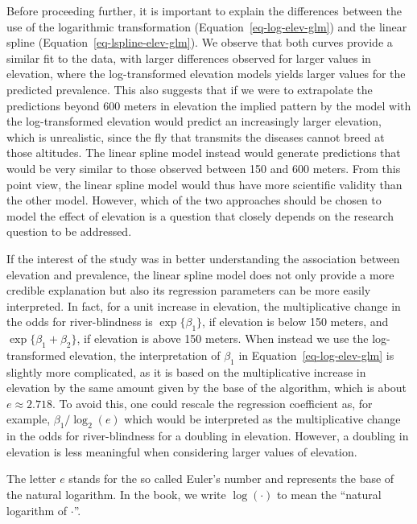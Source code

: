 \documentclass[
  letterpaper,
]{krantz}
\begin{document}
Before proceeding further, it is important to explain the differences
between the use of the logarithmic transformation
(Equation~\ref{eq-log-elev-glm}) and the linear spline
(Equation~\ref{eq-lspline-elev-glm}). We observe that both curves
provide a similar fit to the data, with larger differences observed for
larger values in elevation, where the log-transformed elevation models
yields larger values for the predicted prevalence. This also suggests
that if we were to extrapolate the predictions beyond 600 meters in
elevation the implied pattern by the model with the log-transformed
elevation would predict an increasingly larger elevation, which is
unrealistic, since the fly that transmits the diseases cannot breed at
those altitudes. The linear spline model instead would generate
predictions that would be very similar to those observed between 150 and
600 meters. From this point view, the linear spline model would thus
have more scientific validity than the other model. However, which of
the two approaches should be chosen to model the effect of elevation is
a question that closely depends on the research question to be
addressed.

If the interest of the study was in better understanding the association
between elevation and prevalence, the linear spline model does not only
provide a more credible explanation but also its regression parameters
can be more easily interpreted. In fact, for a unit increase in
elevation, the multiplicative change in the odds for river-blindness is
\(\exp\{\beta_1\}\), if elevation is below 150 meters, and
\(\exp\{\beta_1+\beta_2\}\), if elevation is above 150 meters. When
instead we use the log-transformed elevation, the interpretation of
\(\beta_1\) in Equation~\ref{eq-log-elev-glm} is slightly more
complicated, as it is based on the multiplicative increase in elevation
by the same amount given by the base of the algorithm, which is about
\(e \approx 2.718\). To avoid this, one could rescale the regression
coefficient as, for example, \(\beta_1/\log_{2}(e)\) which would be
interpreted as the multiplicative change in the odds for river-blindness
for a doubling in elevation. However, a doubling in elevation is less
meaningful when considering larger values of elevation.

\begin{tcolorbox}[enhanced jigsaw, leftrule=.75mm, rightrule=.15mm, breakable, opacityback=0, coltitle=black, toprule=.15mm, toptitle=1mm, colbacktitle=quarto-callout-note-color!10!white, bottomrule=.15mm, opacitybacktitle=0.6, arc=.35mm, colback=white, title=\textcolor{quarto-callout-note-color}{\faInfo}\hspace{0.5em}{Note}, colframe=quarto-callout-note-color-frame, titlerule=0mm, bottomtitle=1mm, left=2mm]

The letter \(e\) stands for the so called Euler's number and represents
the base of the natural logarithm. In the book, we write \(\log(\cdot)\)
to mean the ``natural logarithm of \(\cdot\)''.

\end{tcolorbox}
\end{document}
